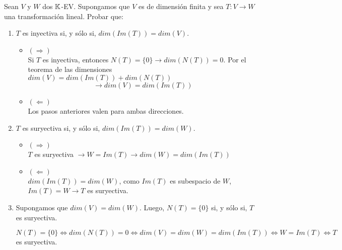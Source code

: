 \item Sean $V$ y $W$ dos $\mathbb{K}$-EV. Supongamos que $V$ es de dimensión finita y sea $T:V\to W$ una transformación lineal. Probar que:
    \begin{enumerate}
        \item $T$ es inyectiva si, y sólo si, $dim(Im(T))=dim(V)$.
            \begin{mdframed}[style=s]
                \begin{itemize}
                    \item $(\Rightarrow)$\\
                        Si $T$ es inyectiva, entonces $N(T)=\{0\}\to dim(N(T))=0$. Por el teorema de las dimensiones $dim(V)=dim(Im(T))+dim(N(T))$
                        \[\to dim(V)=dim(Im(T))\]
                    \item $(\Leftarrow)$\\
                        Los pasos anteriores valen para ambas direcciones.
                \end{itemize}
            \end{mdframed}
        \item $T$ es suryectiva si, y sólo si, $dim(Im(T))=dim(W)$.
            \begin{mdframed}[style=s]
                \begin{itemize}
                    \item $(\Rightarrow)$\\
                        $T$ es suryectiva $\to W=Im(T)\to dim(W)=dim(Im(T))$
                    \item $(\Leftarrow)$\\
                        $dim(Im(T))=dim(W)$, como $Im(T)$ es subespacio de $W$, $Im(T)=W\to T$ es suryectiva.
                \end{itemize}
            \end{mdframed}
        \item Supongamos que $dim(V)=dim(W)$. Luego, $N(T)=\{0\}$ si, y sólo si, $T$ es suryectiva.
            \begin{mdframed}[style=s]
                $N(T)=\{0\}\Leftrightarrow dim(N(T))=0\Leftrightarrow dim(V)=dim(W)=dim(Im(T))\Leftrightarrow W=Im(T)\Leftrightarrow T$ es suryectiva.
            \end{mdframed}
    \end{enumerate}